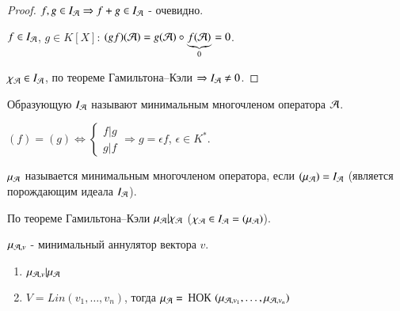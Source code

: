 \documentclass[main]{subfiles}
\begin{document}
\begin{proof}
    $f, g \in I_{\mathcal{A}} \Rightarrow f+g \in I_{\mathcal{A}}$ - очевидно.

    $f \in I_{\mathcal{A}}$, $g \in K[X]$: $(gf)(\mathcal{A}) = g(\mathcal{A}) \circ \underbrace{f(\mathcal{A})}_{0} = 0$.

    $\chi_{\mathcal{A}} \in I_{\mathcal{A}}$,  по теореме Гамильтона--Кэли $\Rightarrow I_{\mathcal{A}} \neq 0$.
\end{proof}

Образующую $I_{\mathcal{A}}$ называют минимальным многочленом  оператора $\mathcal{A}$.

\begin{remark}
    $(f) = (g) \Leftrightarrow \begin{cases}
            f|g \\
            g|f
        \end{cases} \Rightarrow g = \epsilon f$, $\epsilon \in K^*$.
\end{remark}

\begin{definition} 
    $\mu_{\mathcal{A}}$ называется минимальным многочленом оператора, если $(\mu_{\mathcal{A}}) = I_{\mathcal{A}}$ (является порождающим идеала $I_{\mathcal{A}}$).
\end{definition}

По теореме Гамильтона--Кэли $\mu_{\mathcal{A}}|\chi_{\mathcal{A}}$ ($\chi_{\mathcal{A}} \in I_{\mathcal{A}} = (\mu_{\mathcal{A}})$).

$\mu_{\mathcal{A}, v}$ - минимальный аннулятор вектора $v$.
\begin{proposition}
    \begin{enumerate}
        \item $\mu_{\mathcal{A}, v} | \mu_{\mathcal{A}}$
        \item $V = Lin(v_1, \ldots, v_n)$, тогда $\mu_{\mathcal{A}} = $ НОК $(\mu_{\mathcal{A}, v_1}, \ldots, \mu_{\mathcal{A}, v_n})$
    \end{enumerate}
\end{proposition}
\end{document}
